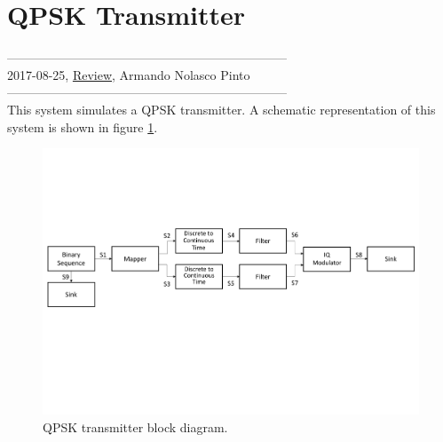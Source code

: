 \section{QPSK Transmitter}

--------------------------------------------------------------------\\
2017-08-25, \underline{Review}, Armando Nolasco Pinto\\
--------------------------------------------------------------------\\

This system simulates a QPSK transmitter. A schematic representation of this system is shown in figure \ref{QPSK_transmitter_block_diagram_simple}.

\begin{figure}[h]
	\centering
	\includegraphics[width=1.0\textwidth]{./sdf/qpsk_transmitter/figures/qpsk_transmitter.pdf}
	\caption{QPSK transmitter block diagram.}\label{QPSK_transmitter_block_diagram_simple}
\end{figure}

